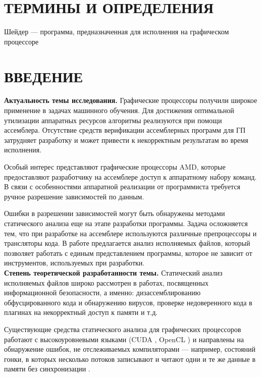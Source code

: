 \documentclass[a4paper,14pt]{extarticle}
\newcommand{\topic}[1]{\textbf{#1.}}
\begin{document}
\tableofcontents

\newpage
\section*{ТЕРМИНЫ И ОПРЕДЕЛЕНИЯ}

Шейдер — программа, предназначенная для исполнения на графическом процессоре

\newpage
\section*{ВВЕДЕНИЕ}

\topic{Актуальность темы исследования} Графические процессоры получили широкое применение
в задачах машинного обучения. Для достижения оптимальной утилизации аппаратных ресурсов
алгоритмы реализуются при помощи ассемблера. Отсутствие средств верификации ассемблерных
программ для ГП затрудняет разработку и может привести к некорректным результатам во время исполнения.

Особый интерес представляют графические процессоры AMD, которые предоставляют разработчику
на ассемблере доступ к аппаратному набору команд. В связи с особенностями аппаратной
реализации от программиста требуется ручное разрешение зависимостей по данным.

Ошибки в разрешении зависимостей могут быть обнаружены методами статического анализа
еще на этапе разработки программы. Задача осложняется тем, что при разработке
на ассемблере используются различные препроцессоры и трансляторы кода. В работе
предлагается анализ исполняемых файлов, который позволяет работать с единым
представлением программы, которое не зависит от инструментов, используемых при разработки.\\

\topic{Степень теоретической разработанности темы} Статический анализ исполняемых файлов
широко рассмотрен в работах, посвященных информационной безопасности, а именно:
дизассемблированию обфусцированного кода и обнаружению вирусов,
проверке недоверенного кода в плагинах на некорректный доступ к памяти и т.д. \cite{static-analysis-binary}

Существующие средства статического анализа для графических процессоров работают с
высокоуровневыми языками (CUDA \cite{cuda}, OpenCL \cite{opencl}) и направлены на обнаружение ошибок,
не отслеживаемых компиляторами — например, состояний гонки, в которых несколько потоков
записывают и читают одни и те же данные в памяти без синхронизации \cite{gpu-static-verification}.
\end{document}
